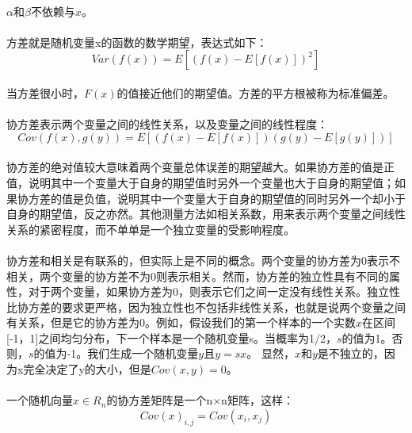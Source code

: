 \documentclass{article}
\begin{document}
    \paragraph{}
    $\alpha$和$\beta$不依赖与$x$。
    \paragraph{}
    方差就是随机变量x的函数的数学期望，表达式如下：
    \begin{equation}
      Var(f(x))=E[(f(x)-E[f(x)])^2] \tag{3.12}
    \end{equation}
    \paragraph{}
    当方差很小时，$F(x)$的值接近他们的期望值。方差的平方根被称为标准偏差。
    \paragraph{}
    协方差表示两个变量之间的线性关系，以及变量之间的线性程度：
    \begin{equation}
      Cov(f(x),g(y))=E[(f(x)-E[f(x)])(g(y)-E[g(y)])] \tag{3.13}
    \end{equation}
    \paragraph{}
    协方差的绝对值较大意味着两个变量总体误差的期望越大。如果协方差的值是正值，说明其中一个变量大于自身的期望值时另外一个变量也大于自身的期望值；如果协方差的值是负值，说明其中一个变量大于自身的期望值的同时另外一个却小于自身的期望值，反之亦然。其他测量方法如相关系数，用来表示两个变量之间线性关系的紧密程度，而不单单是一个独立变量的受影响程度。
    \paragraph{}
    协方差和相关是有联系的，但实际上是不同的概念。两个变量的协方差为0表示不相关，两个变量的协方差不为0则表示相关。然而，协方差的独立性具有不同的属性，对于两个变量，如果协方差为0，则表示它们之间一定没有线性关系。独立性比协方差的要求更严格，因为独立性也不包括非线性关系，也就是说两个变量之间有关系，但是它的协方差为0。例如，假设我们的第一个样本的一个实数$x$在区间[-1，1]之间均匀分布，下一个样本是一个随机变量s。当概率为1/2，$s$的值为1。否则，$s$的值为-1。我们生成一个随机变量$y$且$y=sx$。 显然，$x$和$y$是不独立的，因为x完全决定了y的大小，但是$ Cov(x, y) = 0$。
    \paragraph{}
    一个随机向量$x\in R_{n}$的协方差矩阵是一个n×n矩阵，这样：
    \begin{equation}
      Cov(x)_{i,j}= Cov(x_i,x_j) \tag{3.14}
    \end{equation}
\end{document}

